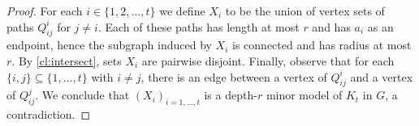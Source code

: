 \begin{proof}
For each $i\in \{1,2,\ldots,t\}$ we define $X_i$ to be the union of vertex sets of paths $Q^i_{ij}$ for $j\neq i$.
Each of these paths has length at most $r$ and has $a_i$ as an endpoint, hence the subgraph induced by $X_i$ is connected and has radius at most $r$.
By \cref{cl:intersect}, sets $X_i$ are pairwise disjoint. Finally, observe that for each $\{i,j\}\subseteq \{1,\ldots,t\}$ with $i\neq j$, there is an edge between a vertex of $Q^{i}_{ij}$ and a vertex of $Q^{j}_{ij}$.
We conclude that $(X_i)_{i=1,\ldots,t}$ is a depth-$r$ minor model of $K_t$ in $G$, a contradiction.
\end{proof}

\begin{comment}
\begin{proof}
Assume there is a set $A=\{a_1,\ldots, a_t\}$ of size $t$ such that
for all subsets $\{a_i,a_j\}\subseteq A$ of size $2$ 
there is an element $v_{ij}\in V(G)\setminus A$ with 
$N_r[v_{ij}]\cap A=\{a_i,a_j\}$. Fix such $v_{ij}$ with the property
that $\max\left(\dist_G(v_{ij},a_i), \dist_G(v_{ij},a_j)\right)$ is 
minimized. 

A \emph{central walk} $W_{ij}$ is the concatenation of a minimum length
path $P_{ij}^i$ from $a_i$ to $v_{ij}$ and a minimum length path $P_{ij}^j$ from $v_{ij}$ to $a_j$. 
Note that a central walk is possibly not a path. For each pair $a_i,a_j$ fix
a central walk $W_{ij}$ and the corresponding paths $P_{ij}^i$ and $P_{ij}^j$. 

Now assume that a vertex $x$ is traversed by two different central 
walks $W_{ij}$, $W_{i'j'}$. By swapping indices if necessary, assume that $x$ lies on $P_{ij}^i$ and $P_{i'j'}^{i'}$. 

First, observe that if $\dist(x,a_i)=\dist(x,a_{i'})$, 
then $a_i=a_{i'}$. Indeed, if $\dist(x,a_i)=\dist(x,a_{i'})$ then $\dist(v_{ij},a_{i})=\dist(v_{ij},a_{i'})$, so $i'\in \{i,j\}$ because $a_i,a_j$ are the only vertices of $A$ at distance at most $r$ from $v_{ij}$.
Analogously $i\in \{i',j'\}$, so either $i=i'$, or $i'=j$ and $i=j'$. However, the latter case would imply $\{i,j\}=\{i',j'\}$, which contradicts the assumption that $W_{ij}$ and $W_{i'j'}$ are distinct. 

A similar argument yields that
$\dist(x,a_i)<\dist(x,a_j)$ 
and $\dist(x,a_{i'})<\dist(x,a_{j'})$. 
Now assume that $\dist(x,a_i)<\dist(x,a_{i'})$. By the same argument as 
above we have $a_{j'}=a_i$, hence $W_{i'j'}=W_{ij'}$. Here, we have
$\dist(x,a_i)<\dist(x,a_j)$ and $\dist(x,a_{i})<\dist(x,a_{i'})$, 
otherwise the walks are not distinct. 


\end{comment}

